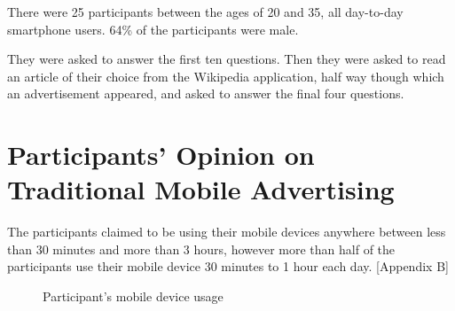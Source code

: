 There were 25 participants between the ages of 20 and 35, all day-to-day smartphone users. 64\% of the participants were male.

They were asked to answer the first ten questions. Then they were asked to read an article of their choice from the Wikipedia application, half way though which an advertisement appeared, and asked to answer the final four questions.

\section{Participants' Opinion on Traditional Mobile Advertising}

The participants claimed to be using their mobile devices anywhere between less than 30 minutes and more than 3 hours, however more than half of the participants use their mobile device 30 minutes to 1 hour each day. [Appendix B]

\begin{figure}
\caption{Participant's mobile device usage}
\end{figure}


